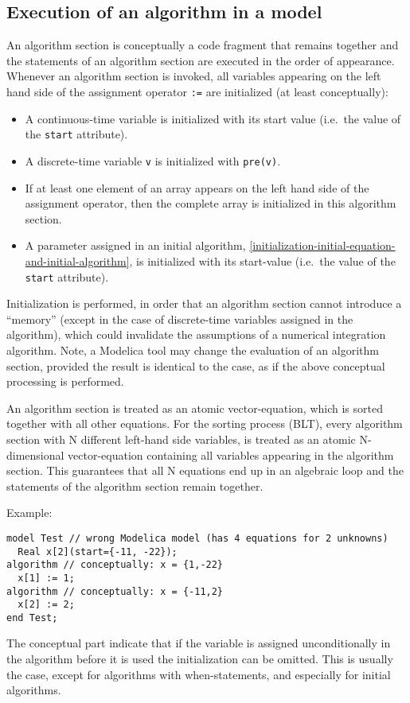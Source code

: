 \subsection{Execution of an algorithm in a model}\label{execution-of-an-algorithm-in-a-model}

An algorithm section is conceptually a code fragment that remains
together and the statements of an algorithm section are executed in the
order of appearance. Whenever an algorithm section is invoked, all
variables appearing on the left hand side of the assignment operator
\lstinline!:=! are initialized (at least conceptually):
\begin{itemize}
\item
  A continuous-time variable is initialized with its start value (i.e.\ the
  value of the \lstinline!start! attribute).
\item
  A discrete-time variable \lstinline!v! is initialized with \lstinline!pre(v)!.
\item
  If at least one element of an array appears on the left hand side of
  the assignment operator, then the complete array is initialized in
  this algorithm section.
\item
  A parameter assigned in an initial algorithm, \cref{initialization-initial-equation-and-initial-algorithm},
  is initialized with its start-value (i.e.\ the value of the \lstinline!start! attribute).
\end{itemize}

\begin{nonnormative}
Initialization is performed, in order that an algorithm section
cannot introduce a ``memory'' (except in the case of discrete-time variables assigned in the algorithm), which could invalidate the assumptions of a
numerical integration algorithm. Note, a Modelica tool may change the
evaluation of an algorithm section, provided the result is identical to
the case, as if the above conceptual processing is performed.

An algorithm section is treated as an atomic vector-equation,
which is sorted together with all other equations. For the sorting
process (BLT), every algorithm section with N different left-hand side
variables, is treated as an atomic N-dimensional vector-equation
containing all variables appearing in the algorithm section. This
guarantees that all N equations end up in an algebraic loop and the
statements of the algorithm section remain together.

Example:
\begin{lstlisting}[language=modelica]
model Test // wrong Modelica model (has 4 equations for 2 unknowns)
  Real x[2](start={-11, -22});
algorithm // conceptually: x = {1,-22}
  x[1] := 1;
algorithm // conceptually: x = {-11,2}
  x[2] := 2;
end Test;
\end{lstlisting}

The conceptual part indicate that if the variable is assigned unconditionally
in the algorithm before it is used the initialization can be omitted.
This is usually the case, except for algorithms with when-statements,
and especially for initial algorithms.
\end{nonnormative}

